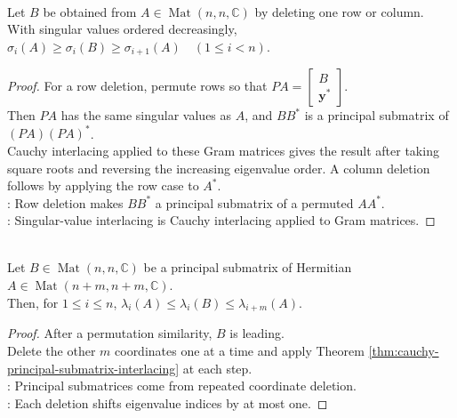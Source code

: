 \begin{corollary} \label{cor:singular-values-interlace-after-deleting-row-or-column} \\
Let $B$ be obtained from $A\in\operatorname{Mat}(n,n,\mathbb{C})$ by deleting one row or column.\\
With singular values ordered decreasingly, $\sigma_i(A)\geq\sigma_i(B)\geq\sigma_{i+1}(A)\quad(1\leq i<n)$.
\begin{proof}
For a row deletion, permute rows so that $PA=\begin{bmatrix}B\\ \mathbf{y}^*\end{bmatrix}$. \\
Then $PA$ has the same singular values as $A$, and $BB^*$ is a principal submatrix of $(PA)(PA)^*$.\\
Cauchy interlacing applied to these Gram matrices gives the result after taking square roots and reversing the increasing eigenvalue order. A column deletion follows by applying the row case to $A^*$.\\
: Row deletion makes $BB^*$ a principal submatrix of a permuted $AA^*$.\\
: Singular-value interlacing is Cauchy interlacing applied to Gram matrices.
\end{proof}
\end{corollary}

\begin{corollary} \label{cor:cauchy-interlacing-general-principal-submatrix} \\
Let $B\in\operatorname{Mat}(n,n,\mathbb{C})$ be a principal submatrix of Hermitian $A\in\operatorname{Mat}(n+m,n+m,\mathbb{C})$.\\
Then, for $1\leq i\leq n$, $\lambda_i(A)\leq\lambda_i(B)\leq\lambda_{i+m}(A)$.
\begin{proof}
After a permutation similarity, $B$ is leading.\\
Delete the other $m$ coordinates one at a time and apply Theorem \ref{thm:cauchy-principal-submatrix-interlacing} at each step.\\
: Principal submatrices come from repeated coordinate deletion.\\
: Each deletion shifts eigenvalue indices by at most one.
\end{proof}
\end{corollary}

